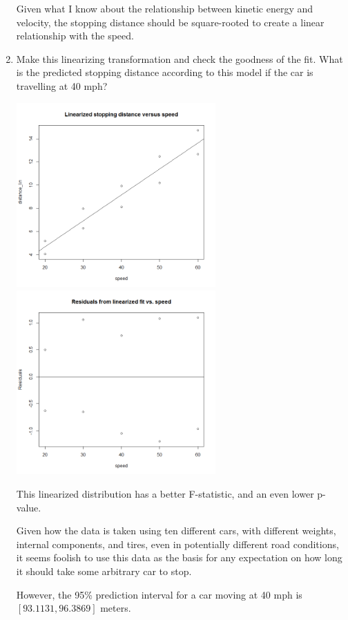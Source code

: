 \documentclass{article}
\begin{document}
\begin{enumerate}[\quad(a)]
	Given what I know about the relationship between kinetic energy and velocity, the stopping distance should be square-rooted to create a linear relationship with the speed.
	\newpage
	\item Make this linearizing transformation and check the goodness of the fit. What is the predicted stopping distance according to this model if the car is travelling at 40 mph?\\
	\begin{center}
		\includegraphics[width=3in]{Q53.png}$\qquad$\includegraphics[width=3in]{Q54.png}
	\end{center}

	This linearized distribution has a better F-statistic, and an even lower p-value.

	Given how the data is taken using ten different cars, with different weights, internal components, and tires, even in potentially different road conditions, it seems foolish to use this data as the basis for any expectation on how long it should take some arbitrary car to stop. 

	However, the 95\% prediction interval for a car moving at 40 mph is $[93.1131, 96.3869]$ meters.
\end{enumerate}
\end{document}
